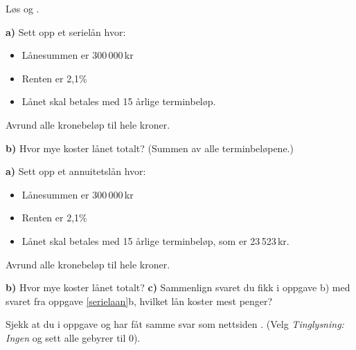 



	
\nes

 \vs
{}

Løs  og .

\textbf{a)} Sett opp et serielån hvor:
\begin{itemize}
	\item Lånesummen er 300\,000\,kr
	\item Renten er 2,1\%
	\item Lånet skal betales med 15 årlige terminbeløp.
\end{itemize}
Avrund alle kronebeløp til hele kroner.\os

\textbf{b)} Hvor mye koster lånet totalt? (Summen av alle terminbeløpene.)

\newpage
{}
\textbf{a)} Sett opp et annuitetslån hvor:
\begin{itemize}
	\item Lånesummen er 300\,000\,kr
	\item Renten er 2,1\%
	\item Lånet skal betales med 15 årlige terminbeløp, som er 23\,523\,kr.
\end{itemize}
Avrund alle kronebeløp til hele kroner.\os

\textbf{b)} Hvor mye koster lånet totalt? \os
\textbf{c)} Sammenlign svaret du fikk i oppgave b) med svaret fra oppgave \ref{serielaan}b, hvilket lån koster mest penger?\os

Sjekk at du i oppgave  og  har fåt samme svar som nettsiden . (Velg \textsl{Tinglysning: Ingen} og sett alle gebyrer til 0).


